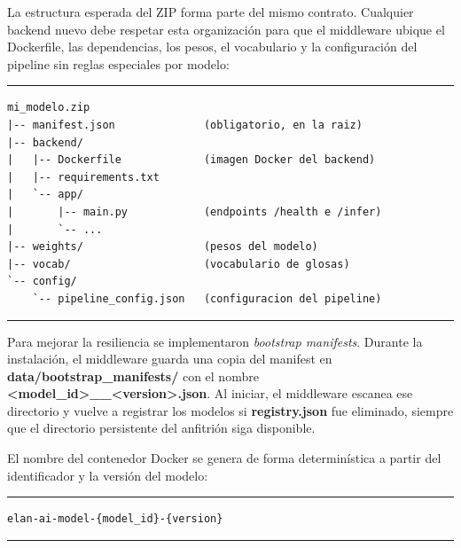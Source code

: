 La estructura esperada del ZIP forma parte del mismo contrato. Cualquier backend nuevo debe respetar esta organización para que el middleware ubique el Dockerfile, las dependencias, los pesos, el vocabulario y la configuración del pipeline sin reglas especiales por modelo:

\begin{center}
\begin{minipage}{0.88\textwidth}
\hrule
\vspace{0.12cm}
\small
\begin{Verbatim}[baselinestretch=0.82]
mi_modelo.zip
|-- manifest.json              (obligatorio, en la raiz)
|-- backend/
|   |-- Dockerfile             (imagen Docker del backend)
|   |-- requirements.txt
|   `-- app/
|       |-- main.py            (endpoints /health e /infer)
|       `-- ...
|-- weights/                   (pesos del modelo)
|-- vocab/                     (vocabulario de glosas)
`-- config/
    `-- pipeline_config.json   (configuracion del pipeline)
\end{Verbatim}
\vspace{0.05cm}
\hrule

\label{lst:estructura_zip_modelo}
\end{minipage}
\end{center}

Para mejorar la resiliencia se implementaron \textit{bootstrap manifests}. Durante la instalación, el middleware guarda una copia del manifest en \textbf{data/bootstrap\_manifests/} con el nombre \textbf{<model\_id>\_\_<version>.json}. Al iniciar, el middleware escanea ese directorio y vuelve a registrar los modelos si \textbf{registry.json} fue eliminado, siempre que el directorio persistente del anfitrión siga disponible.

El nombre del contenedor Docker se genera de forma determinística a partir del identificador y la versión del modelo:

\begin{center}
\begin{minipage}{0.55\textwidth}
\hrule
\vspace{0.12cm}
\small
\begin{Verbatim}[baselinestretch=0.82]
elan-ai-model-{model_id}-{version}
\end{Verbatim}
\vspace{0.05cm}
\hrule

\label{lst:nombre_contenedor_modelo}
\end{minipage}
\end{center}

